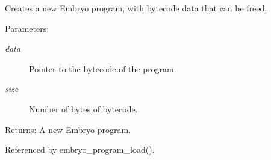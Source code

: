 Creates a new Embryo program, with bytecode data that can be freed. 

\begin{Desc}
\item[Parameters:]
\begin{description}
\item[{\em data}]Pointer to the bytecode of the program. \item[{\em size}]Number of bytes of bytecode. \end{description}
\end{Desc}
\begin{Desc}
\item[Returns:]A new Embryo program. \end{Desc}


Referenced by embryo\_\-program\_\-load().